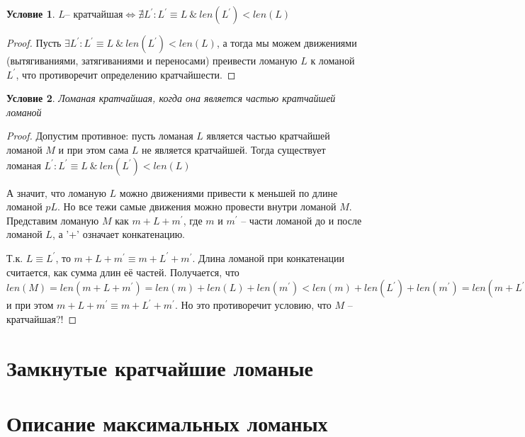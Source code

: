 \documentclass[12pt,a4paper, flushleft]{article}
\newtheorem{Con}{Условие}[section]
\newcommand{\p}[1]{#1^{\prime}}
\begin{document}
\begin{Con}
	$L \text{-- кратчайшая}\Longleftrightarrow\nexists \p L: \p L\equiv L ~\&~ len(\p L)<len(L)$
\end{Con}
\begin{proof}
	Пусть $\exists \p L: \p L\equiv L ~\&~ len(\p L)<len(L)$, а тогда мы можем движениями (вытягиваниями, затягиваниями и переносами) преивести ломаную $L$  к ломаной $\p L$, что противоречит определению кратчайшести.
\end{proof}	

\begin{Con}
	Ломаная кратчайшая, когда она является частью кратчайшей ломаной
\end{Con}
\begin{proof}
	Допустим противное: пусть ломаная $L$ является частью кратчайшей ломаной $M$ и при этом сама $L$ не является кратчайшей. Тогда существует ломаная $\p L: \p L\equiv L~\&~ len(\p L)<len(L)$
	
	А значит, что ломаную $L$ можно движениями привести к меньшей по длине ломаной $p L$. Но все тежи самые движения можно провести внутри ломаной $M$. Представим ломаную $M$ как $m + L + \p m$, где $m$ и $\p m$ -- части ломаной до и после ломаной $L$, а '+' означает конкатенацию. 
	
	Т.к. $L\equiv \p L$, то $m + L + \p m\equiv m+\p L + \p m$. Длина ломаной при конкатенации считается, как сумма длин её частей. Получается, что $len(M) = len(m+L+\p m) = len(m) + len(L) + len(\p m) < len(m) + len(\p L) + len(\p m) = len(m+\p L + \p m)$ и при этом $m+L+\p m\equiv m+\p L+\p m$. Но это противоречит условию, что $M$ -- кратчайшая?!
	
	
\end{proof}

\section{Замкнутые кратчайшие ломаные}

\section{Описание максимальных ломаных}
\end{document}
